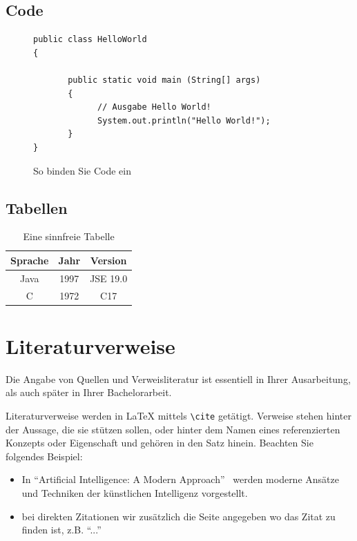 \documentclass{hhuarticle}
\theoremstyle{definition}
\theoremstyle{theorem}
\begin{document}
  \subsection{Code}

  \begin{figure}[h]

\begin{lstlisting}
public class HelloWorld 
{
 
       public static void main (String[] args)
       {
             // Ausgabe Hello World!
             System.out.println("Hello World!");
       }
}
\end{lstlisting}
 \caption{So binden Sie Code ein}%
  \label{fig:codeBlock}
\end{figure}

  \subsection{Tabellen}

\begin{table}[h!]
\centering
\begin{tabular}{ |c|c|c| } 
 \hline
 Sprache & Jahr & Version \\ 
\hline
 Java & 1997 & JSE 19.0 \\ 
 C & 1972 & C17 \\ 
 \hline
\end{tabular}
\caption{Eine sinnfreie Tabelle}
\label{table:1}
\end{table}

  \section{Literaturverweise}

  Die Angabe von Quellen und Verweisliteratur ist essentiell in Ihrer
  Ausarbeitung,
  als auch später in Ihrer Bachelorarbeit.

  Literaturverweise werden in \LaTeX{} mittels
  \texttt{\textbackslash cite} getätigt.
  Verweise stehen hinter der Aussage, die sie stützen sollen,
  oder hinter dem Namen eines referenzierten Konzepts oder Eigenschaft
  und gehören in den Satz hinein.
  Beachten Sie folgendes Beispiel:
  \begin{itemize}
    \item In ``Artificial Intelligence: A Modern Approach''~\cite{russell2002artificial}
      werden moderne Ansätze und Techniken
      der künstlichen Intelligenz vorgestellt.
    \item bei direkten Zitationen wir zusätzlich die Seite angegeben wo das Zitat zu finden ist, z.B. ``...''~\cite[p.1]{russell2002artificial}
  \end{itemize}
\end{document}
